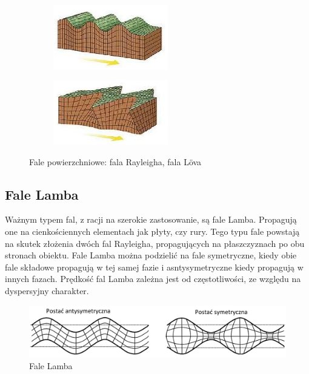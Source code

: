 \begin{figure}[h]
        \centering
        \begin{subfigure}{0.35\textwidth}
                \centering
	     \includegraphics[width=5cm]{Zdjecia/2/fala_rayleigha}
                \subcaption{\label{subfigure_a}}
        \end{subfigure}
        \begin{subfigure}{0.35\textwidth}
                \centering
	     \includegraphics[width=5cm]{Zdjecia/2/fala_lova}
                \subcaption{\label{subfigure_b}}
        \end{subfigure}
        \label{fig:subcaption_example}
        \caption{Fale powierzchniowe: \protect{} fala Rayleigha, \protect{} fala L\"{o}va}
\end{figure}

\subsection{Fale Lamba}

Ważnym typem fal, z racji na szerokie zastosowanie, są fale Lamba. Propagują one na cienkościennych elementach jak płyty, czy rury. Tego typu fale powstają na skutek złożenia dwóch fal Rayleigha, propagujących na płaszczyznach po obu stronach obiektu. Fale Lamba można podzielić na fale symetryczne, kiedy obie fale składowe propagują w tej samej fazie i asntysymetryczne kiedy propagują w innych fazach. Prędkość fal Lamba zależna jest od częstotliwości, ze względu na dyspersyjny charakter.

\begin{figure}[h]
\centering
\includegraphics[width=14cm]{Zdjecia/2/fala_lamba}
\caption{Fale Lamba}
\label{fig:fala_lamba}
\end{figure}






















